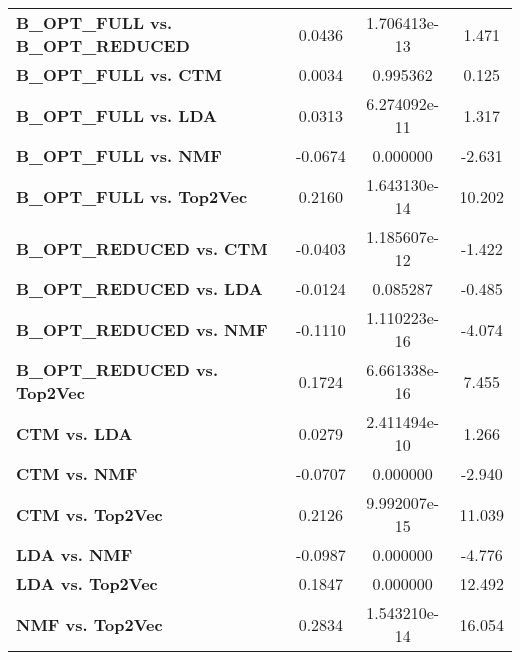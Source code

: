 \begin{table}[ht]
\begin{tabular}{lccc}
        \textbf{B\_OPT\_FULL vs. B\_OPT\_REDUCED}  & 0.0436        & 1.706413e-13     & 1.471              \\
        \textbf{B\_OPT\_FULL vs. CTM}              & 0.0034        & 0.995362         & 0.125              \\
        \textbf{B\_OPT\_FULL vs. LDA}              & 0.0313        & 6.274092e-11     & 1.317              \\
        \textbf{B\_OPT\_FULL vs. NMF}              & -0.0674       & 0.000000         & -2.631             \\
        \textbf{B\_OPT\_FULL vs. Top2Vec}          & 0.2160        & 1.643130e-14     & 10.202             \\
        \textbf{B\_OPT\_REDUCED vs. CTM}           & -0.0403       & 1.185607e-12     & -1.422             \\
        \textbf{B\_OPT\_REDUCED vs. LDA}           & -0.0124       & 0.085287         & -0.485             \\
        \textbf{B\_OPT\_REDUCED vs. NMF}           & -0.1110       & 1.110223e-16     & -4.074             \\
        \textbf{B\_OPT\_REDUCED vs. Top2Vec}       & 0.1724        & 6.661338e-16     & 7.455              \\
        \textbf{CTM vs. LDA}                       & 0.0279        & 2.411494e-10     & 1.266              \\
        \textbf{CTM vs. NMF}                       & -0.0707       & 0.000000         & -2.940             \\
        \textbf{CTM vs. Top2Vec}                   & 0.2126        & 9.992007e-15     & 11.039             \\
        \textbf{LDA vs. NMF}                       & -0.0987       & 0.000000         & -4.776             \\
        \textbf{LDA vs. Top2Vec}                   & 0.1847        & 0.000000         & 12.492             \\
        \textbf{NMF vs. Top2Vec}                   & 0.2834        & 1.543210e-14     & 16.054             \\
        \bottomrule
    \end{tabular}
\end{table}

